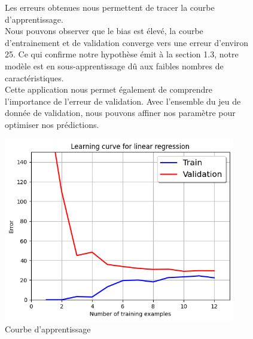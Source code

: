 \begin{figure}[!h]
    \begin{minipage}{.48\linewidth}
       Les erreurs obtenues nous permettent de tracer la courbe d'apprentissage. \\
       Nous pouvons observer que le bias est élevé, la courbe d'entrainement et de validation converge vers une erreur d'environ 25. Ce qui confirme notre hypothèse émit à la section 1.3, notre modèle est en sous-apprentissage dû aux faibles nombres de caractéristiques. \\

       Cette application nous permet également de comprendre l'importance de l'erreur de validation. Avec l'ensemble du jeu de donnée de validation, nous pouvons affiner nos paramètre pour optimiser nos 
       prédictions.
    \end{minipage}\hfill
    \begin{minipage}{.48\linewidth}
        \begin{center}
            \includegraphics[width=0.9\textwidth]{./img/4.1.png}
            \caption{\label{fig:bias-variance}Courbe d'apprentissage}  
        \end{center}
    \end{minipage}
\end{figure}



